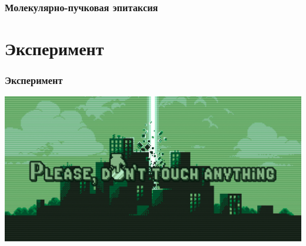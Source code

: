 \documentclass[10pt,pdf,hyperref={unicode}, dvipsnames]{beamer}
\begin{document}
\begin{frame}[t]
	\frametitle{Молекулярно-пучковая эпитаксия}
\end{frame}


\section{Эксперимент}
\begin{frame}[t]
	\frametitle{Эксперимент}
	\includegraphics[width = \linewidth]{imgs/pdt.png}
\end{frame}
\end{document}
